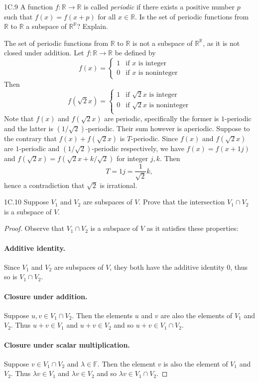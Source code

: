 \documentclass{exam}
\begin{document}
\begin{problem}{1C.9}
    A function $f:\mathbb R\to\mathbb R$ is called \textit{periodic} if there exists a positive number $p$ such that $f(x)=f(x+p)$ for all $x\in\mathbb R$. Is the set of periodic functions from $\mathbb R$ to $\mathbb R$ a subspace of $\mathbb R^{\mathbb R}$? Explain.
\end{problem}
The set of periodic functions from $\mathbb R$ to $\mathbb R$ is not a subspace of $\mathbb R^{\mathbb R}$, as it is not closed under addition. Let $f: \mathbb R\to\mathbb R$ be defined by \[
    f(x) = \begin{cases}
        1 & \text{if }x\text{ is integer}\\
        0 & \text{if }x\text{ is noninteger}
    \end{cases}
\]
Then \[
    f(\sqrt2x) = \begin{cases}
        1 & \text{if }\sqrt2x\text{ is integer}\\
        0 & \text{if }\sqrt2x\text{ is noninteger}\\
    \end{cases}
\]
Note that $f(x)$ and $f(\sqrt2x)$ are periodic, specifically the former is $1$-periodic and the latter is $(1/\sqrt2)$-periodic. Their sum however is aperiodic. Suppose to the contrary that $f(x) + f(\sqrt2x)$ is $T$-periodic. Since $f(x)$ and $f(\sqrt2x)$ are $1$-periodic and $(1/\sqrt2)$-periodic respectively, we have $f(x) = f(x + 1j)$ and $f(\sqrt2x) = f(\sqrt2x + k/\sqrt2)$ for integer $j, k$. Then \[
    T = 1j = \frac1{\sqrt2}k,
\]
hence a contradiction that $\sqrt2$ is irrational.

\begin{problem}{1C.10}
    Suppose $V_1$ and $V_2$ are subspaces of $V$. Prove that the intersection $V_1\cap V_2$ is a subspace of $V$.
\end{problem}

\begin{proof}
    Observe that $V_1\cap V_2$ is a subspace of $V$ as it satisfies these properties:
    \paragraph{Additive identity.} Since $V_1$ and $V_2$ are subspaces of $V$, they both have the additive identity 0, thus so is $V_1\cap V_2$.

    \paragraph{Closure under addition.} Suppose $u, v\in V_1\cap V_2$. Then the elements $u$ and $v$ are also the elements of $V_1$ and $V_2$. Thus $u + v\in V_1$ and $u + v\in V_2$ and so $u + v\in V_1\cap V_2$.

    \paragraph{Closure under scalar multiplication.} Suppose $v\in V_1\cap V_2$ and $\lambda\in\mathbb F$. Then the element $v$ is also the element of $V_1$ and $V_2$. Thus $\lambda v\in V_1$ and $\lambda v\in V_2$ and so $\lambda v\in V_1\cap V_2$.
\end{proof}
\end{document}
